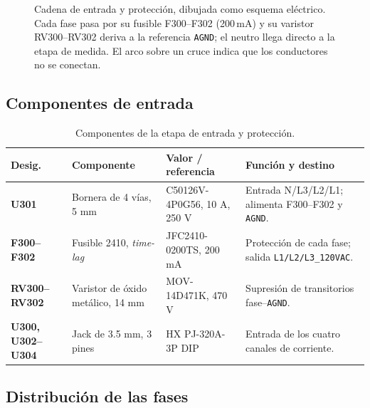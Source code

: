 \documentclass[11pt,a4paper]{article}
\begin{document}
\begin{figure}[H]
\caption{Cadena de entrada y protección, dibujada como esquema eléctrico. Cada
fase pasa por su fusible F300--F302 (200\,mA) y su varistor RV300--RV302 deriva a la
referencia \texttt{AGND}; el neutro llega directo a la etapa de medida. El arco
sobre un cruce indica que los conductores no se conectan.}
\label{fig:entrada}
\end{figure}

\subsection{Componentes de entrada}

\begin{table}[H]
\centering
\caption{Componentes de la etapa de entrada y protección.}
\label{tab:entrada}
\footnotesize
\begin{tabularx}{\textwidth}{@{}>{\bfseries}p{1.5cm} >{\raggedright\arraybackslash}p{3.2cm} >{\raggedright\arraybackslash}X >{\raggedright\arraybackslash}p{4.3cm}@{}}
\toprule
\textbf{Desig.} & \textbf{Componente} & \textbf{Valor / referencia} & \textbf{Función y destino} \\
\midrule
U301 & Bornera de 4 vías, 5 mm & C50126V-4P0G56, 10 A, 250 V & Entrada N/L3/L2/L1; alimenta F300--F302 y \texttt{AGND}. \\
F300--F302 & Fusible 2410, \emph{time-lag} & JFC2410-0200TS, 200 mA & Protección de cada fase; salida \texttt{L1/L2/L3\_120VAC}. \\
RV300--RV302 & Varistor de óxido metálico, 14 mm & MOV-14D471K, 470 V & Supresión de transitorios fase--\texttt{AGND}. \\
U300, U302--U304 & Jack de 3.5 mm, 3 pines & HX PJ-320A-3P DIP & Entrada de los cuatro canales de corriente. \\
\bottomrule
\end{tabularx}
\end{table}

\subsection{Distribución de las fases}
\end{document}
